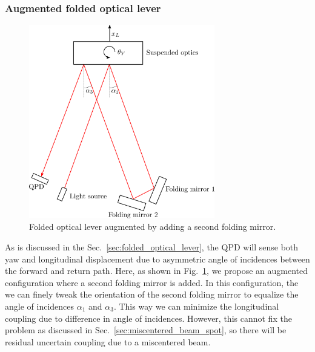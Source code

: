 \subsubsection{Augmented folded optical lever}
\begin{figure}[!h]
	\centering
	\includegraphics[width=81mm]{figures/folded_optical_lever_augmented}
	\caption{Folded optical lever augmented by adding a second folding mirror.}
	\label{fig:foldedopticalleveraugmented}
\end{figure}
As is discussed in the Sec.~\ref{sec:folded_optical_lever}, the QPD will sense both yaw and longitudinal displacement due to asymmetric angle of incidences between the forward and return path.
Here, as shown in Fig.~\ref{fig:foldedopticalleveraugmented}, we propose an augmented configuration where a second folding mirror is added.
In this configuration, the we can finely tweak the orientation of the second folding mirror to equalize the angle of incidences $\alpha_1$ and $\alpha_3$.
This way we can minimize the longitudinal coupling due to difference in angle of incidences.
However, this cannot fix the problem as discussed in Sec.~\ref{sec:miscentered_beam_spot}, so there will be residual uncertain coupling due to a miscentered beam.




